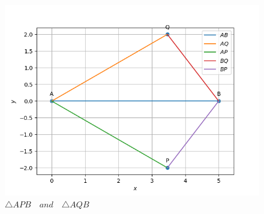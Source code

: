 \documentclass[11pt, a4paper]{article}
\begin{document}
\begin{figure}[H]
    \centering
    \includegraphics[width=\columnwidth]{fig_mat_comp.png}
    \caption{$\triangle APB \hspace{12pt} and \hspace{12pt} \triangle AQB$}
    \label{fig:math_comp2}
\end{figure}
\end{document}
